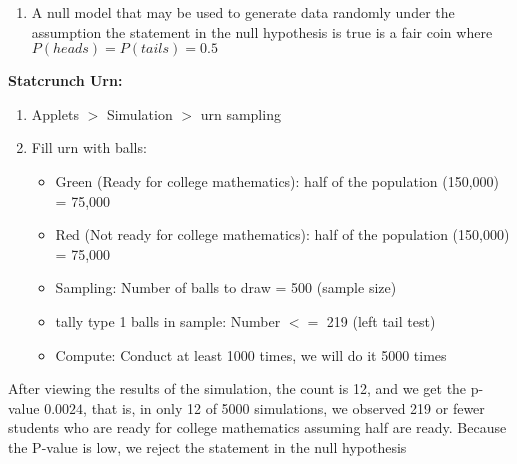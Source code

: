 \documentclass{report}
\begin{document}
\begin{mdframed}
\begin{enumerate}
        \item A null model that may be used to generate data randomly under the assumption the statement in the null hypothesis is true is a fair coin where $P(heads) = P(tails) = 0.5$
      \end{enumerate}
      \textbf{Statcrunch Urn:}
      \begin{enumerate}
          \item Applets $>$ Simulation $> $ urn sampling
        \item Fill urn with balls:
            \begin{itemize}
                \item Green (Ready for college mathematics): half of the population (150,000) = 75,000
                \item Red (Not ready for college mathematics): half of the population (150,000) = 75,000
                \item Sampling: Number of balls to draw = 500 (sample size)
                \item tally type 1 balls in sample: Number $<=$ 219 (left tail test)
                \item Compute: Conduct at least 1000 times, we will do it 5000 times
            \end{itemize}
      \end{enumerate}
      After viewing the results of the simulation, the count is 12, and we get the p-value $0.0024 $, that is, in only 12 of 5000 simulations, we observed 219 or fewer students who are ready for college mathematics assuming half are ready.
      \bigbreak \noindent 
      Because the P-value is low, we reject the statement in the null hypothesis
    \end{mdframed}

    \pagebreak 
\end{document}
